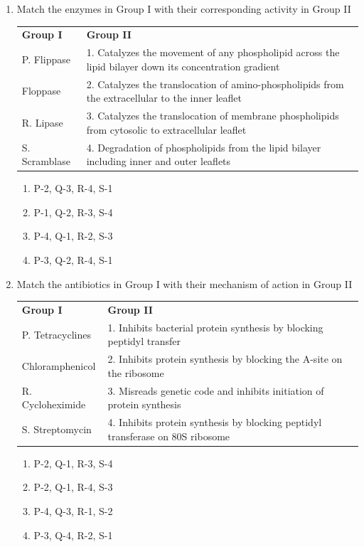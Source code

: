 \documentclass[journal,12pt,onecolumn]{IEEEtran}
\begin{document}
\begin{enumerate}[label=\arabic*.]
\item Match the enzymes in Group I with their corresponding activity in Group II

\begin{center}
\begin{tabular}{p{5cm} p{8cm}}
\textbf{Group I} & \textbf{Group II} \\
P. Flippase      & 1. Catalyzes the movement of any phospholipid across the lipid bilayer down its concentration gradient\\
 Floppase      & 2. Catalyzes the translocation of amino-phospholipids from the extracellular to the inner leaflet\\
R. Lipase        & 3. Catalyzes the translocation of membrane phospholipids from cytosolic to extracellular leaflet\\
S. Scramblase    & 4. Degradation of phospholipids from the lipid bilayer including inner and outer leaflets\\
\end{tabular}
\end{center}
\begin{multicols}{2}
\begin{enumerate}[label=(\Alph*)]
\item P-2, Q-3, R-4, S-1
\item P-1, Q-2, R-3, S-4
\item P-4, Q-1, R-2, S-3
\item P-3, Q-2, R-4, S-1
\end{enumerate}
\end{multicols}

\item Match the antibiotics in Group I with their mechanism of action in Group II

\begin{center}
\begin{tabular}{p{5cm} p{8cm}}
\textbf{Group I} & \textbf{Group II}\\
P. Tetracyclines & 1. Inhibits bacterial protein synthesis by blocking peptidyl transfer\\
 Chloramphenicol & 2. Inhibits protein synthesis by blocking the A-site on the ribosome\\
R. Cycloheximide & 3. Misreads genetic code and inhibits initiation of protein synthesis\\
S. Streptomycin & 4. Inhibits protein synthesis by blocking peptidyl transferase on 80S ribosome\\
\end{tabular}
\end{center}
\begin{multicols}{2}
\begin{enumerate}[label=(\Alph*)]
\item P-2, Q-1, R-3, S-4
\item P-2, Q-1, R-4, S-3
\item P-4, Q-3, R-1, S-2
\item P-3, Q-4, R-2, S-1
\end{enumerate}
\end{multicols}


\end{enumerate}
\end{document}
